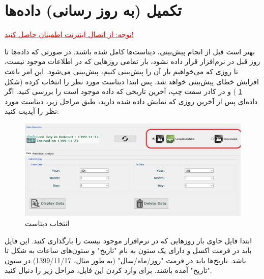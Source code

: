 \documentclass[a4paper,20pt,dvipsnames, usenames]{extbook}
\begin{document}
\section{تکمیل (به روز رسانی) داده‌ها}
\underline{\textcolor{red}{توجه:
		از اتصال اینترنت اطمینان حاصل کنید!}}

بهتر است قبل از انجام پیش‌بینی، دیتاست‌ها کامل شده باشند. در صورتی که داده‌ها تا روز قبل در نرم‌افزار قرار داده نشود، بار تمامی روزهایی که در اطلاعات موجود نیست، تا روزی که می‌خواهیم بار آن را پیش‌بینی کنیم، پیش‌بینی می‌شود. این امر باعث افزایش خطای پیش‌بینی خواهد شد. پس ابتدا دیتاست مورد نظر را انتخاب کرده (شکل
\ref{fig31}
) و در کادر سمت چپ، آخرین تاریخی که داده موجود است را بررسی کنید. اگر داده‌ای پس از آخرین روزی که نمایش داده شده دارید، طبق مراحل زیر، دیتاست مورد نظر را آپدیت کنید:

\begin{figure}[!h]
	\centering
	\includegraphics[width = \textwidth]{fig1}
	\caption{انتخاب دیتاست}
	\label{fig31}
\end{figure}

ابتدا فایل حاوی بار روزهایی که در نرم‌افزار موجود نیست را بارگذاری کنید. این فایل باید در فرمت اکسل و  دارای یک ستون به نام "تاریخ" و ستون‌های ساعات به شکل 
تا
باشد. تاریخ‌ها باید در فرمت "روز/ماه/سال" (به طور مثال، 1399/11/17) در ستون "تاریخ" آمده باشند. برای وارد کردن این فایل، مراحل زیر را دنبال کنید.
\end{document}
